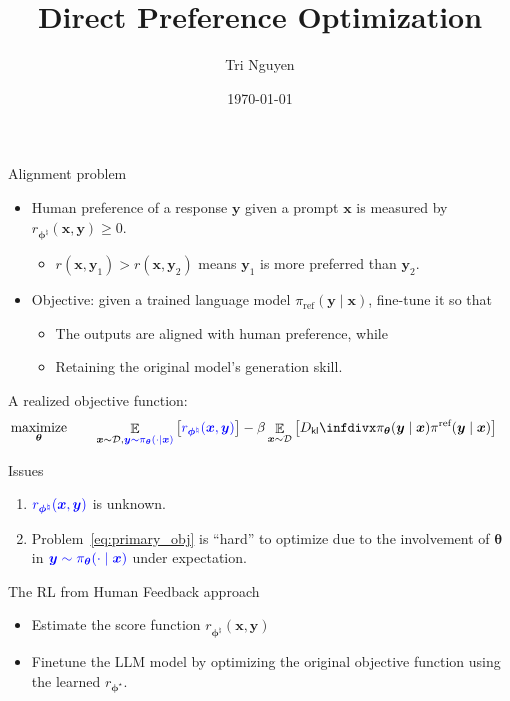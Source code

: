 \documentclass[10pt,xcolor={usenames,dvipsnames,table},aspectratio=169]{beamer}
\title[DPO]{Direct Preference Optimization}
\author{Tri Nguyen}
\institute[OSU] 
{
Oregon State University 
}
\date{\today} %
\begin{document}
\frame{\titlepage}

\begin{frame}{Alignment problem}
\begin{itemize}
    \item Human preference of a response $\bm{y}$ given a prompt $\bm{x}$ is measured by $r_{\boldsymbol \phi^{\natural}}(\bm{x}, \bm{y}) \geq 0$.
        \begin{itemize}
            \item $r(\bm{x}, \bm{y}_1) > r(\bm{x}, \bm{y}_2)$ means $\bm{y}_1$ is more preferred than $\bm{y}_2$.
        \end{itemize}
    \item Objective: given a trained language model $\pi_{\text{ref}}(\bm{y} \mid \bm{x})$, fine-tune it so that
    \begin{itemize}
        \item The outputs are aligned with human preference, while
        \item Retaining the original model's generation skill.
    \end{itemize}
\end{itemize}
A realized objective function:
\begin{alignat}{2}
    \label{eq:primary_obj}
    & \maximize_{\boldsymbol \theta} \quad && \mathop{\mathbb{E}}_{\bm{x} \sim \mathcal{D}, {\blue \bm{y} \sim \pi_{\boldsymbol \theta}(\cdot \mid \bm{x})}} \left[  {\blue r_{\boldsymbol \phi^{\natural}}(\bm{x}, \bm{y})} \right] 
    - \beta \mathop{\mathbb{E}}_{\bm{x} \sim \mathcal{D}} \left[  \Dkl{\pi_{\boldsymbol \theta}(\bm{y} \mid \bm{x})}{\pi^{\text{ref}}(\bm{y} \mid \bm{x})}\right]
\end{alignat}
\begin{alertblock}{Issues}
    \begin{enumerate}
        \item $\color{blue} r_{\boldsymbol \phi^{\natural}}(\bm{x}, \bm{y})$ is unknown.
        \item Problem~\eqref{eq:primary_obj} is ``hard'' to optimize due to the involvement of $\boldsymbol \theta$ in $\color{blue} \bm{y} \sim \pi_{\boldsymbol \theta}(\cdot \mid \bm{x})$ under expectation.
    \end{enumerate}
\end{alertblock}
\end{frame}

\begin{frame}{The RL from Human Feedback approach \citep{ziegler2019fine}}
    
    \begin{itemize}
        \item Estimate the score function $r_{\boldsymbol \phi^{\natural}}(\bm{x}, \bm{y})$ 
        \item Finetune the LLM model by optimizing the original objective function using the learned $r_{\boldsymbol \phi^{\star }}$.
    \end{itemize}
\end{frame}
\end{document}
